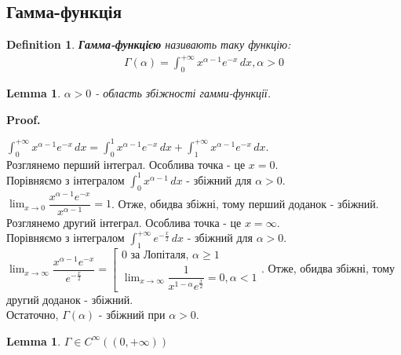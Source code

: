 \documentclass[a4paper, 10pt]{article}
\makeatletter
\def\huge{\displaystyle}
\def\qed{$\blacksquare$}
\theoremstyle{theoremdd}
\theoremstyle{theoremdd}
\theoremstyle{theoremdd}
\newtheorem{definition}[theorem]{Definition}
\theoremstyle{theoremdd}
\theoremstyle{theoremdd}
\theoremstyle{theoremdd}
\theoremstyle{theoremdd}
\theoremstyle{theoremdd}
\newtheorem{lemma}[theorem]{Lemma}
\theoremstyle{theoremdd}
\renewenvironment{proof}[1][Proof.\\]{\par
\pushQED{\hfill \qed}%
\normalfont \topsep6\p@\@plus6\p@\relax
\trivlist
\item\relax
{\bfseries
#1\@addpunct{.}}\hspace\labelsep\ignorespaces
}{%
\popQED\endtrivlist\@endpefalse
}
\makeatother
\begin{document}
\subsection{Гамма-функція}
\begin{definition}
\textbf{Гамма-функцією} називають таку функцію:
\begin{align*}
\Gamma(\alpha) = \huge \int_0^{+\infty} x^{\alpha-1}e^{-x}\,dx, \alpha > 0
\end{align*}
\end{definition}

\begin{lemma}
$\alpha > 0$ - область збіжності гамми-функції.
\end{lemma}

\begin{proof}
$\huge \int_0^{+\infty} x^{\alpha-1}e^{-x}\,dx = \int_0^1 x^{\alpha-1}e^{-x}\,dx + \int_1^{+\infty} x^{\alpha-1}e^{-x}\,dx$.\\
Розглянемо перший інтеграл. Особлива точка - це $x = 0$.\\ Порівняємо з інтегралом $\huge \int_0^1 x^{\alpha-1}\,dx$ - збіжний для $\alpha > 0$.\\
$\huge \lim_{x \to 0} \dfrac{x^{\alpha-1} e^{-x}}{x^{\alpha -1}} = 1$. Отже, обидва збіжні, тому перший доданок - збіжний.\\
Розглянемо другий інтеграл. Особлива точка - це $x = \infty$.\\ Порівняємо з інтегралом $\huge \int_1^{+\infty} e^{-\frac{x}{2}} \,dx$ - збіжний для $\alpha > 0$.\\
$\huge \lim_{x \to \infty} \dfrac{x^{\alpha -1} e^{-x}}{ e^{-\frac{x}{2}}} = \left[ \begin{gathered} 0 \textrm{ за Лопіталя, } \alpha \geq 1 \\ \huge \lim_{x \to \infty} \dfrac{1}{x^{1-\alpha} e^{\frac{x}{2}}} = 0, \alpha < 1 \end{gathered} \right.$. Отже, обидва збіжні, тому другий доданок - збіжний.\\
Остаточно, $\Gamma(\alpha)$ - збіжний при $\alpha > 0$.
\end{proof}

\begin{lemma}
$\Gamma \in C^{\infty} ((0,+\infty))$
\end{lemma}
\end{document}
